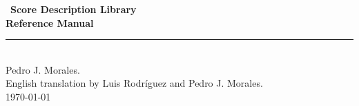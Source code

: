 \documentclass[a4paper,11pt,twoside,titlepage]{article}
\numberwithin{figure}{section}
\numberwithin{table}{section}
\numberwithin{equation}{section} %
\begin{document}

\begin{titlepage}

 {\ \vfill \Huge\bfseries\sffamily \hfill Score Description Library\\[0.5cm]
        \mdseries \mbox{} \hfill Reference Manual\\
        \rule{\textwidth}{1mm}} \\[0.2cm]
 {\sffamily \mbox{} \hfill Pedro J. Morales.} \\
{\sffamily \mbox{} \hfill English translation by Luis Rodr\'iguez and Pedro J. Morales.} \\


 {\sffamily \hfill \today} \\[1cm]

\end{titlepage}

\thispagestyle{empty}
\mbox{}
\pagebreak



\setcounter{page}{1}
\renewcommand{\thepage}{\roman{page}}


\tableofcontents

\newpage


\setcounter{page}{1}
\renewcommand{\thepage}{\arabic{page}}


 


% 
% 


\end{document}
